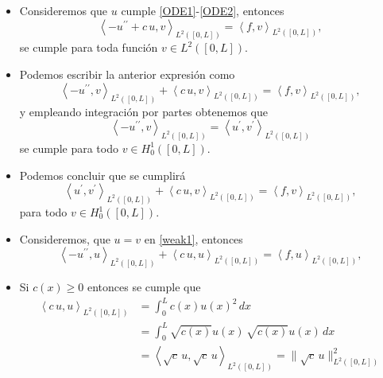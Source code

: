 \documentclass[10pt,handout]{beamer}
\theoremstyle{plain} %
\theoremstyle{plain} %
\theoremstyle{plain} %
\theoremstyle{plain} %
\theoremstyle{definition}
\theoremstyle{example}
\theoremstyle{example}
\theoremstyle{remark}
\theoremstyle{remark}
\begin{document}
\begin{frame}
\begin{itemize}
\item Consideremos que $u$ cumple \eqref{ODE1}-\eqref{ODE2}, entonces
\begin{equation}
\left\langle  - u^{\prime \prime} + c\,u, v \right\rangle_{L^2([0,L])} =  \left\langle f, v \right\rangle_{L^2([0,L])},\label{weak1}
\end{equation}
se cumple para toda función $v \in L^2([0,L]).$ 
\item Podemos escribir la anterior expresión como
$$
\left\langle  - u^{\prime \prime} , v \right\rangle_{L^2([0,L])}  + \left\langle  c\,u, v \right\rangle_{L^2([0,L])}=  \left\langle f, v \right\rangle_{L^2([0,L])},
$$
y empleando integración por partes obtenemos que
$$
\left\langle  - u^{\prime \prime} , v \right\rangle_{L^2([0,L])} = \left\langle  u^{\prime} , v^{\prime} \right\rangle_{L^2([0,L])}
$$
se cumple para todo $v \in H_{0}^1([0,L]).$
\item Podemos concluir que se cumplirá
$$
\left\langle  u^{\prime} , v^{\prime} \right\rangle_{L^2([0,L])}  + \left\langle  c\,u, v \right\rangle_{L^2([0,L])}=  \left\langle f, v \right\rangle_{L^2([0,L])},
$$
para todo $v \in H_{0}^1([0,L]).$
\end{itemize}
\end{frame}

\begin{frame}
\begin{itemize}
\item Consideremos, que $u=v$ en \eqref{weak1}, entonces
$$
\left\langle  - u^{\prime \prime} , u \right\rangle_{L^2([0,L])}  + \left\langle  c\,u, u \right\rangle_{L^2([0,L])}=  \left\langle f, u \right\rangle_{L^2([0,L])},
$$
\item Si $c(x) \ge 0$ entonces se cumple que
\begin{align*}
\left\langle  c\,u, u \right\rangle_{L^2([0,L])} & = \int_0^L c(x)u(x)^2\, dx \\ 
&  =
 \int_0^L \sqrt{c(x)}u(x)\, \sqrt{c(x)}u(x) \, dx \\ 
 & = \left\langle  \sqrt{c}\,u, \sqrt{c}\, u \right\rangle_{L^2([0,L])} = \|\sqrt{c}\,u\|_{L^2([0,L])}^2
\end{align*}
\end{itemize}
\end{frame}
\end{document}
